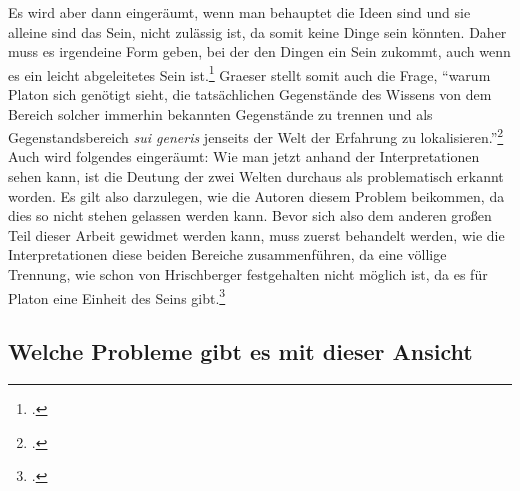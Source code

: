 Es wird aber dann eingeräumt, wenn man behauptet die Ideen sind und sie alleine sind das Sein, nicht zulässig ist, da somit keine Dinge sein könnten. Daher muss es irgendeine Form geben, bei der den Dingen ein Sein zukommt, auch wenn es ein leicht abgeleitetes Sein ist.\footcite[vgl.][S. 131]{Martin73}
Graeser stellt somit auch die Frage, \enquote{warum Platon sich genötigt sieht, die tatsächlichen Gegenstände des Wissens von dem Bereich solcher immerhin bekannten Gegenstände zu trennen und als Gegenstandsbereich \emph{sui generis} jenseits der Welt der Erfahrung zu lokalisieren.}\footcite[][S. 135]{GraeserPhiloGeschichte}
Auch wird folgendes eingeräumt: 
Wie man jetzt anhand der Interpretationen sehen kann, ist die Deutung der zwei Welten durchaus als problematisch erkannt worden. Es gilt also darzulegen, wie die Autoren diesem Problem beikommen, da dies so nicht stehen gelassen werden kann. 
Bevor sich also dem anderen großen Teil dieser Arbeit gewidmet werden kann, muss zuerst behandelt werden, wie die Interpretationen diese beiden Bereiche zusammenführen, da eine völlige Trennung, wie schon von Hrischberger festgehalten nicht möglich ist, da es für Platon eine Einheit des Seins gibt.\footcite[vgl][S. 100]{Hirschberger}
\subsection{Welche Probleme gibt es mit dieser Ansicht}
